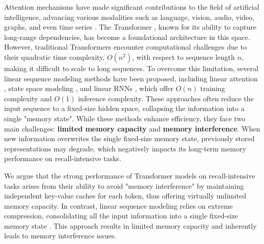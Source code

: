 
Attention mechanisms have made significant contributions to the field of artificial intelligence, advancing various modalities such as language, vision, audio, video, graphs, and even time series \cite{achiam2023gpt,team2023internlm}. The Transformer \cite{vaswani2017attention}, known for its ability to capture long-range dependencies, has become a foundational architecture in this space. However, traditional Transformers encounter computational challenges due to their quadratic time complexity, $O(n^2)$, with respect to sequence length $n$, making it difficult to scale to long sequences. To overcome this limitation, several linear sequence modeling methods have been proposed, including linear attention \cite{katharopoulos2020transformers,qin2023transnormerllm, li2025minimax}, state space modeling \cite{gu2024mambalineartimesequencemodeling, dao2024transformers}, and linear RNNs \cite{peng2024eagle, qin2024hgrn2}, which offer $O(n)$ training complexity and $O(1)$ inference complexity. These approaches often reduce the input sequence to a fixed-size hidden space, collapsing the information into a single "memory state". While these methods enhance efficiency, they face two main challenges: \textbf{limited memory capacity} and \textbf{memory interference}. When new information overwrites the single fixed-size memory state, previously stored representations may degrade, which negatively impacts its long-term memory performance on recall-intensive tasks.



We argue that the strong performance of Transformer models on recall-intensive tasks arises from their ability to avoid "memory interference" by maintaining independent key-value caches for each token, thus offering virtually unlimited memory capacity. In contrast, linear sequence modeling relies on extreme compression, consolidating all the input information into a single fixed-size memory state \cite{katharopoulos2020transformers,dao2024transformers}. This approach results in limited memory capacity and inherently leads to memory interference issues.



